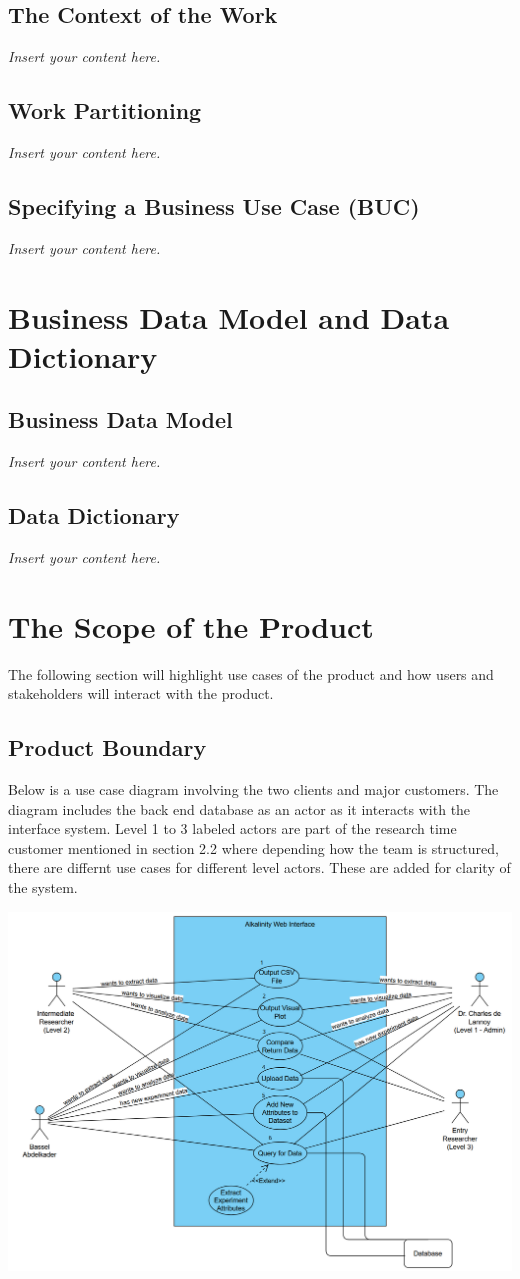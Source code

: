 \documentclass[12pt]{article}
\newcommand{\lips}{\textit{Insert your content here.}}
\begin{document}
\subsection{The Context of the Work}
\lips
\subsection{Work Partitioning}
\lips
\subsection{Specifying a Business Use Case (BUC)}
\lips

\section{Business Data Model and Data Dictionary}
\subsection{Business Data Model}
\lips
\subsection{Data Dictionary}
\lips

\section{The Scope of the Product}
The following section will highlight use cases of the product and how users and
stakeholders will interact with the product.  
\subsection{Product Boundary}
Below is a use case diagram involving the two clients and major customers. The
diagram includes the back end database as an actor as it interacts with the
interface system. Level 1 to 3 labeled actors are part of the research time
customer mentioned in section 2.2 where depending how the team is structured,
there are differnt use cases for different level actors. These are added for
clarity of the system.
\begin{center}
  \includegraphics[scale=0.5]{capstoneUseCase.png}
\end{center}
\end{document}
